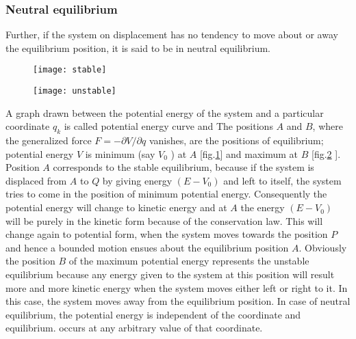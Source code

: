 \subsubsection{Neutral equilibrium}
 Further, if the system on displacement has no tendency to move about or away the equilibrium position, it is said to be in neutral equilibrium.\\
 \begin{minipage}{0.5\textwidth}
 \begin{figure}[H]
 	\centering
 	\texttt{[image: stable]}
 	\caption{}
 	\label{fig1}
 \end{figure}
 \end{minipage}
\begin{minipage}{0.5\textwidth}
\begin{figure}[H]
	\centering
	\texttt{[image: unstable]}
	\caption{}
	\label{fig2}
\end{figure}
\end{minipage}
A graph drawn between the potential energy of the system and a particular coordinate $q_{k}$ is called potential energy curve and  The positions $A$ and $B$, where the generalized force $F=-\partial V / \partial q$ vanishes, are the positions of equilibrium; potential energy $V$ is minimum (say $V_{0}$ ) at $A$ [fig.\ref{fig1}] and maximum at $B$ [fig.\ref{fig2} ]. Position $A$ corresponds to the stable equilibrium, because if the system is displaced from $A$ to $Q$ by giving energy $\left(E-V_{0}\right)$ and left to itself, the system tries to come in the position of minimum potential energy. Consequently the potential energy will change to kinetic energy and at $A$ the energy $\left(E-V_{0}\right)$ will be purely in the kinetic form because of the conservation law. This will change again to potential form, when the system moves towards the position $P$ and hence a bounded motion ensues about the equilibrium position $A$. Obviously the position $B$ of the maximum potential energy represents the unstable equilibrium because any energy given to the system at this position will result more and more kinetic energy when the system moves either left or right to it. In this case, the system moves away from the equilibrium position. In case of neutral equilibrium, the potential energy is independent of the coordinate and equilibrium. occurs at any arbitrary value of that coordinate.
